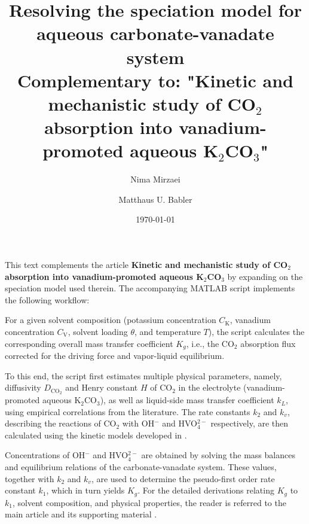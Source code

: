 \documentclass[onecolumn,aps,prl,floatfix,superscriptaddress,longbibliography,showkeys,fleqn]{revtex4-2}
\begin{document}
\graphicspath{{./Images/}}
	
		
	
\title{Resolving the speciation model for aqueous carbonate-vanadate system \\ 
	\small Complementary to: "Kinetic and mechanistic study of CO$_2$ absorption into vanadium-promoted aqueous K$_2$CO$_3$"}
\author{Nima Mirzaei}
\author{Matthaus U. Babler}
\date{\today}
	
	
	
\maketitle
	
	




This text complements the article {\bf Kinetic and mechanistic study of CO$_2$ absorption into vanadium-promoted aqueous K$_2$CO$_3$} \cite{mirzaei2025kinetic} by expanding on the speciation model used therein. The accompanying MATLAB script implements the following workflow:

For a given solvent composition (potassium concentration $C_{\mathrm{K}}$, vanadium concentration $C_{\mathrm{V}}$, solvent loading $\theta$, and temperature $T$), the script calculates the corresponding overall mass transfer coefficient $K_g$, i.e., the CO$_2$ absorption flux corrected for the driving force and vapor-liquid equilibrium.

To this end, the script first estimates multiple physical parameters, namely, diffusivity $D_{\mathrm{CO_2}}$ and Henry constant $H$ of CO$_2$ in the electrolyte (vanadium-promoted aqueous K$_2$CO$_3$), as well as liquid-side mass transfer coefficient $k_L$, using empirical correlations from the literature. The rate constants $k_2$ and $k_v$, describing the reactions of CO$_2$ with OH$^-$ and HVO$_4^{2-}$ respectively, are then calculated using the kinetic models developed in \cite{mirzaei2025kinetic}.

Concentrations of OH$^-$ and HVO$_4^{2-}$ are obtained by solving the mass balances and equilibrium relations of the carbonate-vanadate system. These values, together with $k_2$ and $k_v$, are used to determine the pseudo-first order rate constant $k_1$, which in turn yields $K_g$.
For the detailed derivations relating $K_g$ to $k_1$, solvent composition, and physical properties, the reader is referred to the main article and its supporting material \cite{mirzaei2025kinetic}.
\end{document}
